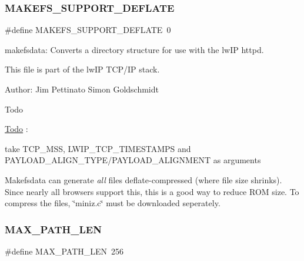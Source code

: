 \subsubsection{\texorpdfstring{M\+A\+K\+E\+F\+S\+\_\+\+S\+U\+P\+P\+O\+R\+T\+\_\+\+D\+E\+F\+L\+A\+TE}{MAKEFS\_SUPPORT\_DEFLATE}}
{\footnotesize\ttfamily \#define M\+A\+K\+E\+F\+S\+\_\+\+S\+U\+P\+P\+O\+R\+T\+\_\+\+D\+E\+F\+L\+A\+TE~0}

makefsdata\+: Converts a directory structure for use with the lw\+IP httpd.

This file is part of the lw\+IP T\+C\+P/\+IP stack.

Author\+: Jim Pettinato Simon Goldschmidt

\begin{DoxyRefDesc}{Todo}
\item[\hyperlink{todo__todo000012}{Todo}]\+:
\begin{DoxyItemize}
\item take T\+C\+P\+\_\+\+M\+SS, L\+W\+I\+P\+\_\+\+T\+C\+P\+\_\+\+T\+I\+M\+E\+S\+T\+A\+M\+PS and P\+A\+Y\+L\+O\+A\+D\+\_\+\+A\+L\+I\+G\+N\+\_\+\+T\+Y\+P\+E/\+P\+A\+Y\+L\+O\+A\+D\+\_\+\+A\+L\+I\+G\+N\+M\+E\+NT as arguments 
\end{DoxyItemize}\end{DoxyRefDesc}
Makefsdata can generate {\itshape all} files deflate-\/compressed (where file size shrinks). Since nearly all browsers support this, this is a good way to reduce R\+OM size. To compress the files, \char`\"{}miniz.\+c\char`\"{} must be downloaded seperately. \mbox{\label{openmote-cc2538_2lwip_2src_2apps_2httpd_2makefsdata_2makefsdata_8c_abdd33f362ae3bbdacb5de76473aa8a2f}} 
\subsubsection{\texorpdfstring{M\+A\+X\+\_\+\+P\+A\+T\+H\+\_\+\+L\+EN}{MAX\_PATH\_LEN}}
{\footnotesize\ttfamily \#define M\+A\+X\+\_\+\+P\+A\+T\+H\+\_\+\+L\+EN~256}

